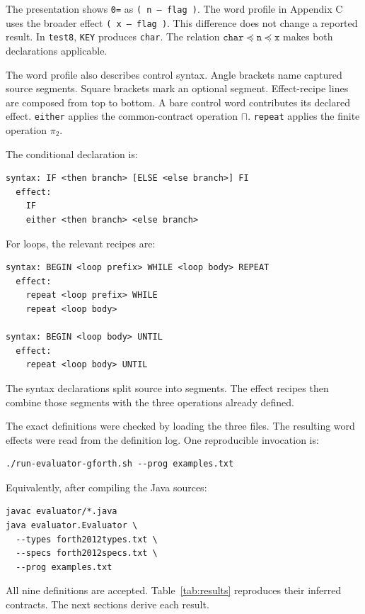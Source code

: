 \documentclass[11pt,a4paper]{article}
\newcommand{\effect}[1]{\mbox{\texttt{#1}}}
\newcommand{\meet}{\mathbin{\sqcap}}
\begin{document}
The presentation shows \texttt{0=} as \effect{( n -- flag )}.  The word
profile in Appendix C uses the broader effect \effect{( x -- flag )}.  This
difference does not change a reported result.  In \texttt{test8}, \texttt{KEY}
produces \texttt{char}.  The relation
$\texttt{char}\preceq\texttt{n}\preceq\texttt{x}$ makes both declarations
applicable.

The word profile also describes control syntax.  Angle brackets name captured
source segments.  Square brackets mark an optional segment.  Effect-recipe
lines are composed from top to bottom.  A bare control word contributes its
declared effect.  \texttt{either} applies the common-contract operation
$\meet$.  \texttt{repeat} applies the finite operation $\pi_2$.

The conditional declaration is:
\begin{verbatim}
syntax: IF <then branch> [ELSE <else branch>] FI
  effect:
    IF
    either <then branch> <else branch>
\end{verbatim}
\medskip
\noindent For loops, the relevant recipes are:
\begin{verbatim}
syntax: BEGIN <loop prefix> WHILE <loop body> REPEAT
  effect:
    repeat <loop prefix> WHILE
    repeat <loop body>

syntax: BEGIN <loop body> UNTIL
  effect:
    repeat <loop body> UNTIL
\end{verbatim}
The syntax declarations split source into segments.  The effect recipes then
combine those segments with the three operations already defined.

The exact definitions were checked by loading the three files.  The resulting
word effects were read from the definition log.  One reproducible invocation
is:
\begin{verbatim}
./run-evaluator-gforth.sh --prog examples.txt
\end{verbatim}
Equivalently, after compiling the Java sources:
\begin{verbatim}
javac evaluator/*.java
java evaluator.Evaluator \
  --types forth2012types.txt \
  --specs forth2012specs.txt \
  --prog examples.txt
\end{verbatim}
\clearpage
All nine definitions are accepted.  Table~\ref{tab:results} reproduces their
inferred contracts.  The next sections derive each result.
\end{document}
